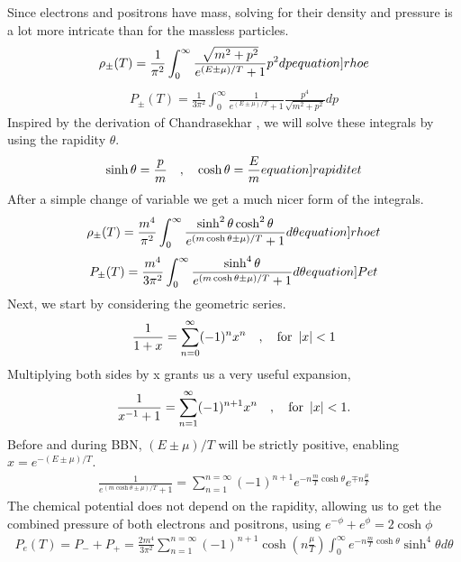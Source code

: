 Since electrons and positrons have mass, solving for their density and pressure is a lot more intricate than for the massless particles.
\begin{align}
    \rho_\pm(T)=\frac{1}{\pi^2}\int_{0}^{\infty}\frac{\sqrt{m^2+p^2}}{e^{(E\pm\mu)/T}+1}p^2 dp
    \label[equation]{rhoe}
\end{align}
\begin{align}
    P_\pm(T)=\frac{1}{3\pi^2}\int_{0}^{\infty}\frac{1}{e^{(E\pm\mu)/T}+1}\frac{p^4}{\sqrt{m^2+p^2}} dp
\end{align}
Inspired by the derivation of Chandrasekhar \cite{Chandrasekhar}, we will solve these integrals by using the rapidity $\theta$.
\begin{align}
    \sinh \theta = \frac{p}{m}\eqsep \cosh \theta = \frac{E}{m}
    \label[equation]{rapiditet}
\end{align}
After a simple change of variable we get a much nicer form of the integrals.
\begin{align}
    \rho_\pm(T)=\frac{m^4}{\pi^2}\int_{0}^{\infty}\frac{\sinh^2 \theta \cosh^2\theta}{e^{(m \cosh\theta\pm\mu)/T}+1} d\theta
    \label[equation]{rhoet}
\end{align}
\begin{align}
    P_\pm(T)=\frac{m^4}{3\pi^2}\int_{0}^{\infty}\frac{\sinh^4 \theta}{e^{(m \cosh\theta\pm\mu)/T}+1} d\theta
    \label[equation]{Pet}
\end{align}
Next, we start by considering the geometric series.
\begin{align}
    \frac{1}{1+x}=\sum_{n=0}^{\infty}(-1)^n x^n \quad , \quad \text{for  }  \left|x\right|<1
\end{align}
Multiplying both sides by x grants us a very useful expansion,
\begin{align}
    \frac{1}{x^{-1}+1}=\sum_{n=1}^{\infty}(-1)^{n+1} x^n \quad , \quad \text{for  }  \left|x\right|<1.
\end{align}
Before and during BBN, $(E\pm\mu)/T $ will be strictly positive, enabling $x=e^{-(E\pm\mu)/T}$.
\begin{align}
    \frac{1}{e^{(m \cosh\theta\pm\mu)/T}+1}=\sum_{n=1}^{n=\infty} (-1)^{n+1} e^{-n\frac{m }{T}\cosh\theta}e^{\mp n\frac{\mu}{T}}
    \label{eq:electronseries}
\end{align}
The chemical potential does not depend on the rapidity, allowing us to get the combined pressure of both electrons and positrons, using $e^{-\phi}+e^{\phi}=2\cosh\phi$
\begin{align}
    P_e(T)=P_-+P_+=\frac{2m^4}{3\pi^2}\sum_{n=1}^{n=\infty} (-1)^{n+1} \cosh{\left(n\frac{\mu}{T}\right)}  \int_{0}^{\infty}e^{-n\frac{m }{T}\cosh\theta}\sinh^4 \theta d\theta
\end{align}
